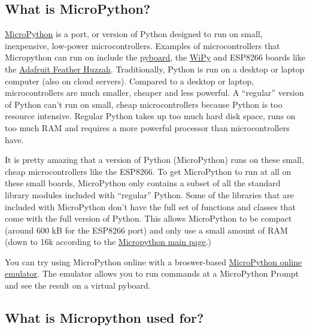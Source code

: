 \documentclass{book}
\begin{document}
    
        \subsection{What is MicroPython?}\label{what-is-micropython}
    




    
        \href{http://micropython.org/}{MicroPython} is a port, or version of
Python designed to run on small, inexpensive, low-power
microcontrollers. Examples of microcontrollers that Micropython can run
on include the \href{https://store.micropython.org/}{pyboard}, the
\href{https://pycom.io/development-boards}{WiPy} and ESP8266 boards like
the
\href{https://learn.adafruit.com/adafruit-feather-huzzah-esp8266}{Adafruit
Feather Huzzah}. Traditionally, Python is run on a desktop or laptop
computer (also on cloud servers). Compared to a desktop or laptop,
microcontrollers are much smaller, cheaper and less powerful. A
``regular'' version of Python can't run on small, cheap microcontrollers
because Python is too resource intensive. Regular Python takes up too
much hard disk space, runs on too much RAM and requires a more powerful
processor than microcontrollers have.

It is pretty amazing that a version of Python (MicroPython) runs on
these small, cheap microcontrollers like the ESP8266. To get MicroPython
to run at all on these small boards, MicroPython only contains a subset
of all the standard library modules included with ``regular'' Python.
Some of the libraries that are included with MicroPython don't have the
full set of functions and classes that come with the full version of
Python. This allows MicroPython to be compact (around 600 kB for the
ESP8266 port) and only use a small amount of RAM (down to 16k according
to the \href{https://micropython.org/}{Micropython main page}.)

You can try using MicroPython online with a broswer-based
\href{https://micropython.org/unicorn/}{MicroPython online emulator}.
The emulator allows you to run commands at a MicroPython Prompt and see
the result on a virtual pyboard.
    




    
        \subsection{What is Micropython used
for?}\label{what-is-micropython-used-for}
    
\end{document}
